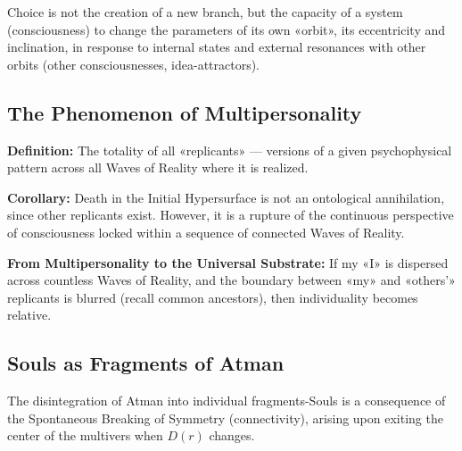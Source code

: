 \documentclass[a4paper,12pt]{article}
\begin{document}
	Choice is not the creation of a new branch, but the capacity of a system (consciousness) to change the parameters of its own «orbit», its eccentricity and inclination, in response to internal states and external resonances with other orbits (other consciousnesses, idea-attractors).
	
	\subsection{The Phenomenon of Multipersonality}
	
	\textbf{Definition:} The totality of all «replicants» — versions of a given psychophysical pattern across all Waves of Reality where it is realized.
	
	\textbf{Corollary:} Death in the Initial Hypersurface is not an ontological annihilation, since other replicants exist. However, it is a rupture of the continuous perspective of consciousness locked within a sequence of connected Waves of Reality.
	
	\textbf{From Multipersonality to the Universal Substrate:} If my «I» is dispersed across countless Waves of Reality, and the boundary between «my» and «others'» replicants is blurred (recall common ancestors), then individuality becomes relative.
	
	\subsection{Souls as Fragments of Atman}
	
	The disintegration of Atman into individual fragments-Souls is a consequence of the Spontaneous Breaking of Symmetry (connectivity), arising upon exiting the center of the multivers when $D(r)$ changes.
	
\end{document}
